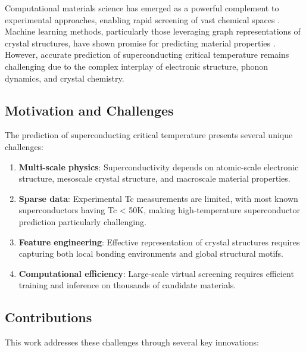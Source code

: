 \documentclass[11pt,a4paper]{article}
\begin{document}
Computational materials science has emerged as a powerful complement to experimental approaches, enabling rapid screening of vast chemical spaces \citep{curtarolo2013aflow}. Machine learning methods, particularly those leveraging graph representations of crystal structures, have shown promise for predicting material properties \citep{xie2018crystal, chen2019graph}. However, accurate prediction of superconducting critical temperature remains challenging due to the complex interplay of electronic structure, phonon dynamics, and crystal chemistry.

\subsection{Motivation and Challenges}

The prediction of superconducting critical temperature presents several unique challenges:

\begin{enumerate}
    \item \textbf{Multi-scale physics}: Superconductivity depends on atomic-scale electronic structure, mesoscale crystal structure, and macroscale material properties.
    
    \item \textbf{Sparse data}: Experimental Tc measurements are limited, with most known superconductors having Tc < 50K, making high-temperature superconductor prediction particularly challenging.
    
    \item \textbf{Feature engineering}: Effective representation of crystal structures requires capturing both local bonding environments and global structural motifs.
    
    \item \textbf{Computational efficiency}: Large-scale virtual screening requires efficient training and inference on thousands of candidate materials.
\end{enumerate}

\subsection{Contributions}

This work addresses these challenges through several key innovations:
\end{document}
